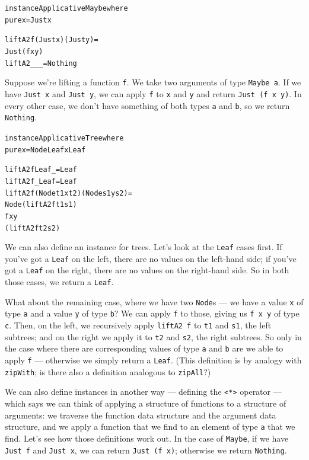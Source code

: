 \begin{alltt}
instance Applicative Maybe where
  pure x = Just x

  liftA2 f (Just x) (Just y) =
    Just (f x y)
  liftA2 _ _ _ = Nothing
\end{alltt}
Suppose we're lifting a function \texttt{f}. We take two arguments of type \texttt{Maybe a}. If we have \texttt{Just x} and \texttt{Just y}, we can apply \texttt{f} to \texttt{x} and \texttt{y} and return \texttt{Just (f x y)}. In every other case, we don't have something of both types \texttt{a} and \texttt{b}, so we return \texttt{Nothing}.
\begin{alltt}
instance Applicative Tree where
  pure x = Node Leaf x Leaf

  liftA2 f Leaf _ = Leaf
  liftA2 f _ Leaf = Leaf
  liftA2 f (Node t1 x t2) (Node s1 y s2) =
    Node (liftA2 f t1 s1)
         f x y
         (liftA2 f t2 s2)
\end{alltt}
We can also define an instance for trees. Let's look at the \texttt{Leaf} cases first.
If you've got a \texttt{Leaf} on the left, there are no values on the left-hand side; if you've got a \texttt{Leaf} on the right, there are no values on the right-hand side. So in both those cases, we return a \texttt{Leaf}. 

What about the remaining case, where we have two \texttt{Node}s — we have a value \texttt{x} of type \texttt{a} and a value \texttt{y} of type \texttt{b}? We can apply \texttt{f} to those, giving us \texttt{f x y} of type \texttt{c}. Then, on the left, we recursively apply \texttt{liftA2 f} to \texttt{t1} and \texttt{s1}, the left subtrees; and on the right we apply it to \texttt{t2} and \texttt{s2}, the right subtrees. So only in the case where there are corresponding values of type \texttt{a} and \texttt{b} are we able to apply \texttt{f} — otherwise we simply return a \texttt{Leaf}. (This definition is by analogy with \texttt{zipWith}; is there also a definition analogous to \texttt{zipAll}?)

We can also define instances in another way — defining the \texttt{<*>} operator — which says we can think of applying a structure of functions to a structure of arguments: we traverse the function data structure and the argument data structure, and we apply a function that we find to an element of type \texttt{a} that we find. Let's see how those definitions work out. In the case of \texttt{Maybe}, if we have \texttt{Just f} and \texttt{Just x}, we can return \texttt{Just (f x)}; otherwise we return \texttt{Nothing}. 

